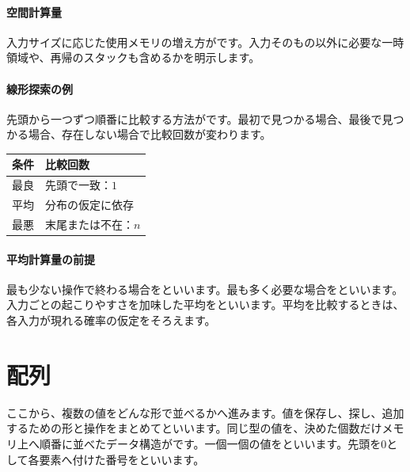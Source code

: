 \paragraph{空間計算量}
        入力サイズに応じた使用メモリの増え方がです。入力そのもの以外に必要な一時領域や、再帰のスタックも含めるかを明示します。

\par
\endgroup
\medskip
\begingroup
\paragraph{線形探索の例}
        先頭から一つずつ順番に比較する方法がです。最初で見つかる場合、最後で見つかる場合、存在しない場合で比較回数が変わります。
        \begin{tabularx}{\linewidth}{@{}p{28mm}Y@{}}
          \toprule
          条件 & 比較回数\\
          \midrule
          最良 & 先頭で一致：$1$\\
          平均 & 分布の仮定に依存\\
          最悪 & 末尾または不在：$n$\\
          \bottomrule
        \end{tabularx}

\paragraph{平均計算量の前提}
        最も少ない操作で終わる場合をといいます。最も多く必要な場合をといいます。入力ごとの起こりやすさを加味した平均をといいます。平均を比較するときは、各入力が現れる確率の仮定をそろえます。

\par
\endgroup
\par
\endgroup




\section{配列}
\label{sec:03-runtime-data-13}

ここから、複数の値をどんな形で並べるかへ進みます。値を保存し、探し、追加するための形と操作をまとめてといいます。同じ型の値を、決めた個数だけメモリ上へ順番に並べたデータ構造がです。一個一個の値をといいます。先頭を0として各要素へ付けた番号をといいます。

